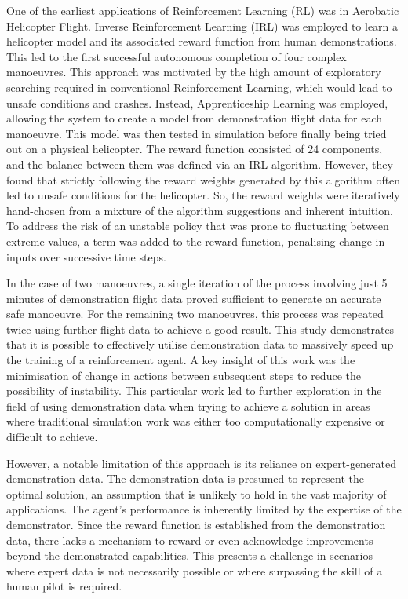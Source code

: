 One of the earliest applications of Reinforcement Learning (RL) was in Aerobatic Helicopter Flight\cite{abbeelRLAerobaticFlight}.
Inverse Reinforcement Learning (IRL) was employed to learn a helicopter model and its associated reward function from human demonstrations.
This led to the first successful autonomous completion of four complex manoeuvres.
This approach was motivated by the high amount of exploratory searching required in conventional Reinforcement Learning, which would lead to unsafe conditions and crashes.
Instead, Apprenticeship Learning was employed, allowing the system to create a model from demonstration flight data for each manoeuvre.
This model was then tested in simulation before finally being tried out on a physical helicopter.
The reward function consisted of 24 components, and the balance between them was defined via an IRL algorithm.
However, they found that strictly following the reward weights generated by this algorithm often led to unsafe conditions for the helicopter.
So, the reward weights were iteratively hand-chosen from a mixture of the algorithm suggestions and inherent intuition. 
To address the risk of an unstable policy that was prone to fluctuating between extreme values, a term was added to the reward function, penalising change in inputs over successive time steps.

In the case of two manoeuvres, a single iteration of the process involving just 5 minutes of demonstration flight data proved sufficient to generate an accurate safe manoeuvre.
For the remaining two manoeuvres, this process was repeated twice using further flight data to achieve a good result.
This study demonstrates that it is possible to effectively utilise demonstration data to massively speed up the training of a reinforcement agent.
A key insight of this work was the minimisation of change in actions between subsequent steps to reduce the possibility of instability.
This particular work led to further exploration in the field of using demonstration data when trying to achieve a solution in areas where traditional simulation work was either too computationally expensive or difficult to achieve.

However, a notable limitation of this approach is its reliance on expert-generated demonstration data.
The demonstration data is presumed to represent the optimal solution, an assumption that is unlikely to hold in the vast majority of applications.
The agent's performance is inherently limited by the expertise of the demonstrator.
Since the reward function is established from the demonstration data, there lacks a mechanism to reward or even acknowledge improvements beyond the demonstrated capabilities.
This presents a challenge in scenarios where expert data is not necessarily possible or where surpassing the skill of a human pilot is required. \\\\

